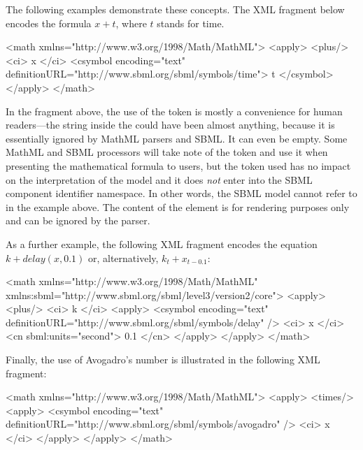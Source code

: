 The following examples demonstrate these concepts.  The XML fragment below
encodes the formula $x + t$, where $t$ stands for time.

\begin{example}
<math xmlns="http://www.w3.org/1998/Math/MathML">
    <apply>
        <plus/>
        <ci> x </ci>
        <csymbol encoding="text" definitionURL="http://www.sbml.org/sbml/symbols/time">
            t
        </csymbol>
    </apply>
</math>
\end{example}


In the fragment above, the use of the token  is mostly a
convenience for human readers---the string inside the
 could have been almost anything, because it is
essentially ignored by MathML parsers and SBML.  It can
  even be empty.  Some MathML and SBML processors will take note
of the token and use it when presenting the mathematical formula
to users, but the token used has no impact on the interpretation
of the model and it does \emph{not} enter into the SBML component
identifier namespace.  In other words, the SBML model cannot refer
to  in the example above.  The content of the
 element is for rendering purposes only and can be
ignored by the parser.

As a further example, the following XML fragment encodes the equation
$k + delay(x, 0.1)$ or, alternatively, $k_t + x_{t - 0.1}$:

\begin{example}
<math xmlns="http://www.w3.org/1998/Math/MathML"
      xmlns:sbml="http://www.sbml.org/sbml/level3/version2/core">
    <apply>
        <plus/>
        <ci> k </ci>
        <apply>
            <csymbol encoding="text" definitionURL="http://www.sbml.org/sbml/symbols/delay" />
            <ci> x </ci>
            <cn sbml:units="second"> 0.1 </cn>
        </apply>
    </apply>
</math>
\end{example}

Finally, the use of Avogadro's number is illustrated in the
following XML fragment:

\begin{example}
<math xmlns="http://www.w3.org/1998/Math/MathML">
    <apply>
        <times/>
        <apply>
            <csymbol encoding="text" definitionURL="http://www.sbml.org/sbml/symbols/avogadro" />
            <ci> x </ci>
        </apply>
    </apply>
</math>
\end{example}


